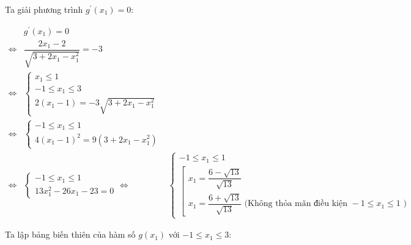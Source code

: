 \documentclass[14pt, a4paper]{article}
\theoremstyle{sltheorem}
\theoremstyle{soltheorem}
\begin{document}
    Ta giải phương trình $g^{\prime}(x_1) = 0$:

    \begin{equation*}
        \begin{aligned}
            &g^{\prime}(x_1) = 0 \\
            \Leftrightarrow &\dfrac{2 x_1 - 2}{\sqrt{3 + 2x_1 - x_1^2}} = -3 \\
            \Leftrightarrow &\begin{cases}
                x_1 \leq 1 \\
                -1 \leq x_1 \leq 3 \\
                2(x_1 - 1) = -3\sqrt{3 + 2x_1 - x_1^2}
            \end{cases} \\
            \Leftrightarrow & \begin{cases}
                -1 \leq x_1 \leq 1 \\
                4(x_1 - 1)^2 = 9(3 + 2x_1 - x_1^2)
            \end{cases} \\
            \Leftrightarrow & \begin{cases}
                -1 \leq x_1 \leq 1 \\
                13x_1^2 - 26 x_1 - 23 = 0
            \end{cases}
            \Leftrightarrow & \begin{cases}
                -1 \leq x_1 \leq 1 \\
                \left [ \begin{array}{l} x_1 = \dfrac{6 - \sqrt{13}}{\sqrt{13}} \\ x_1 = \dfrac{6 + \sqrt{13}}{\sqrt{13}} \text{ (Không thỏa mãn điều kiện } -1 \leq x_1 \leq 1 \text{ )} \end{array}\right.
            \end{cases}
        \end{aligned}
    \end{equation*}

    Ta lập bảng biến thiên của hàm số $g(x_1)$ với $-1 \leq x_1 \leq 3$:

\end{document}
